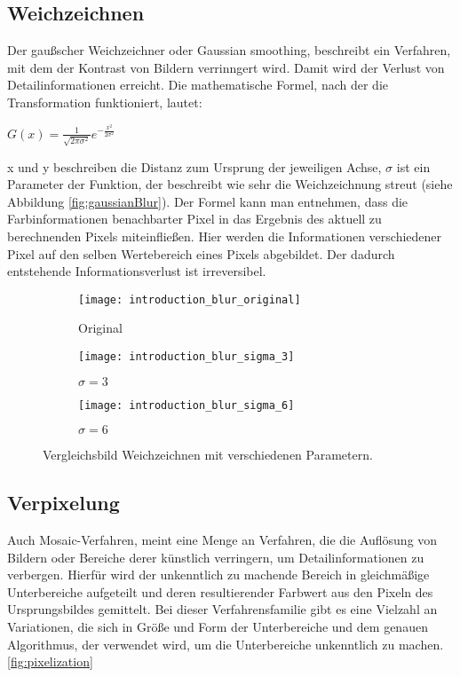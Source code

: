 \subsection{Weichzeichnen}
Der gaußscher Weichzeichner oder Gaussian smoothing, beschreibt ein Verfahren, mit dem der Kontrast von Bildern
verrinngert wird. Damit wird der Verlust von Detailinformationen erreicht. Die mathematische Formel, nach der die
Transformation funktioniert, lautet:

\parskip\baselineskip
\(G(x) = \frac{1}{\sqrt{2 \pi \sigma^2}} e^{-\frac{x^2}{2 \sigma^2}}\)
\par
\par

x und y beschreiben die Distanz zum Ursprung der jeweiligen Achse, \(\sigma\) ist ein Parameter der Funktion, der
beschreibt wie sehr die Weichzeichnung streut (siehe Abbildung \vref*{fig:gaussianBlur}).
Der Formel kann man entnehmen, dass die
Farbinformationen benachbarter Pixel in das Ergebnis des aktuell zu berechnenden Pixels miteinfließen. Hier werden
die Informationen verschiedener Pixel auf den selben Wertebereich eines Pixels abgebildet. Der dadurch entstehende
Informationsverlust ist irreversibel.

\captionsetup[subfigure]{labelformat=empty, labelsep=none}
\begin{figure}[h]
    \centering
    \begin{subfigure}{0.3\textwidth}
        \texttt{[image: introduction\_blur\_original]}
        \caption{\tiny Original}
    \end{subfigure}
    \begin{subfigure}{0.3\textwidth}
        \texttt{[image: introduction\_blur\_sigma\_3]}
        \caption{\tiny \(\sigma = 3\)}
    \end{subfigure}
    \begin{subfigure}{0.3\textwidth}
        \texttt{[image: introduction\_blur\_sigma\_6]}
        \caption{\tiny \(\sigma = 6\)}
    \end{subfigure}

    \caption{Vergleichsbild Weichzeichnen mit verschiedenen Parametern.}
    \label{fig:gaussianBlur}
\end{figure}

\subsection{Verpixelung}
Auch Mosaic-Verfahren, meint eine Menge an Verfahren, die die Auflösung von Bildern oder Bereiche derer künstlich
verringern, um Detailinformationen zu verbergen. Hierfür wird der unkenntlich zu machende Bereich in gleichmäßige
Unterbereiche aufgeteilt und deren resultierender Farbwert aus den Pixeln des Ursprungsbildes gemittelt. Bei dieser
Verfahrensfamilie gibt es eine Vielzahl an Variationen, die sich in Größe und Form der Unterbereiche und dem genauen
Algorithmus, der verwendet wird, um die Unterbereiche unkenntlich zu machen. \ref{fig:pixelization}

